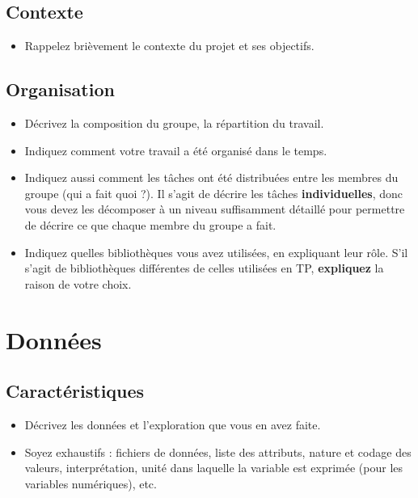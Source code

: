 \documentclass{ceri/sty/rapport}
\begin{document}
\subsection{Contexte}
\begin{itemize}
	\item Rappelez brièvement le contexte du projet et ses objectifs.
\end{itemize}




\subsection{Organisation}
\begin{itemize}
	\item Décrivez la composition du groupe, la répartition du travail.
	\item Indiquez comment votre travail a été organisé dans le temps.
	\item Indiquez aussi comment les tâches ont été distribuées entre les membres du groupe (qui a fait quoi ?). Il s'agit de décrire les tâches \textbf{individuelles}, donc vous devez les décomposer à un niveau suffisamment détaillé pour permettre de décrire ce que chaque membre du groupe a fait.
	\item Indiquez quelles bibliothèques vous avez utilisées, en expliquant leur rôle. S'il s'agit de bibliothèques différentes de celles utilisées en TP, \textbf{expliquez} la raison de votre choix.
\end{itemize}



















\section{Données}

\subsection{Caractéristiques}
\begin{itemize}
	\item Décrivez les données et l'exploration que vous en avez faite.
	\item Soyez exhaustifs : fichiers de données, liste des attributs, nature et codage des valeurs, interprétation, unité dans laquelle la variable est exprimée (pour les variables numériques), etc.
\end{itemize}
\end{document}
